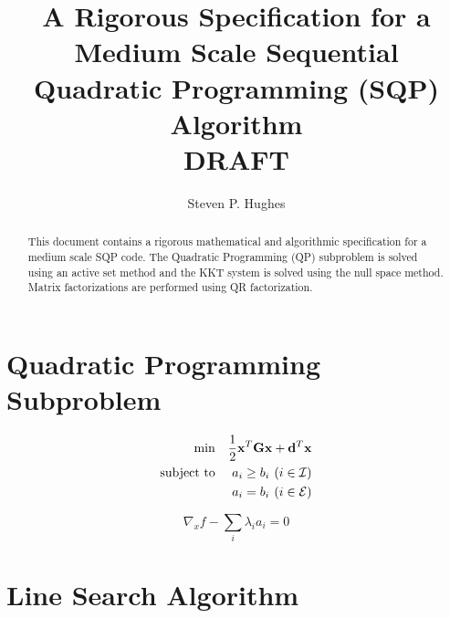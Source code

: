 \documentclass[]{aiaa-tc}%
\title{A Rigorous Specification for a Medium Scale Sequential Quadratic Programming (SQP) Algorithm\\DRAFT}
\author{
  Steven P. Hughes
 }
\begin{document}
\maketitle

\begin{abstract}
   This document contains a rigorous mathematical and algorithmic specification for
   a medium scale SQP code.  The Quadratic Programming (QP) subproblem is solved using
   an active set method and the KKT system is solved using the null space method.  Matrix
   factorizations are performed using QR factorization.
\end{abstract}

\section{Quadratic Programming Subproblem}

\begin{eqnarray}
   \mbox{min} & & \frac{1}{2}\mathbf{x}^T\mathbf{G}\mathbf{x} + \mathbf{d}^T \mathbf{x}\\
   \mbox{subject to} & & a_i \geq b_i \hspace{.05 in} (i \in \mathcal{I})\\
     & & a_i = b_i \hspace{.05 in} (i \in \mathcal{E})
\end{eqnarray}


\begin{equation}
    \nabla_x f - \sum_i \lambda_i a_i = 0
\end{equation}

\section{Line Search Algorithm}
\end{document}
